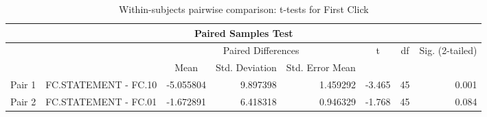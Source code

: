 \documentclass[a4paper]{article}
\begin{document}

\begin{table}[H]
\begin{center}
\caption{Within-subjects pairwise comparison: t-tests for First Click}
\label{tab:abct}
\begin{tabular}{|l|l|l|r|r|r|r|r|} 
\hline
\multicolumn{8}{|c|}{Paired Samples Test}                                                                                                                                                                                                                                                                                                               \\ 
\hline
       &                                      & \multicolumn{3}{c|}{Paired Differences}                                                                                                                   & \multicolumn{1}{c|}{\multirow{3}{*}{t}} & \multicolumn{1}{c|}{\multirow{3}{*}{df}} & \multicolumn{1}{c|}{\multirow{3}{*}{Sig. (2-tailed)}}  \\ 
\cline{1-5}
       &                                      & \multicolumn{1}{c|}{\multirow{2}{*}{Mean}} & \multicolumn{1}{c|}{\multirow{2}{*}{Std. Deviation}} & \multicolumn{1}{c|}{\multirow{2}{*}{Std. Error Mean}} & \multicolumn{1}{c|}{}                   & \multicolumn{1}{c|}{}                    & \multicolumn{1}{c|}{}                                  \\ 
\cline{1-2}
       &                                      & \multicolumn{1}{c|}{}                      & \multicolumn{1}{c|}{}                                & \multicolumn{1}{c|}{}                                 & \multicolumn{1}{c|}{}                   & \multicolumn{1}{c|}{}                    & \multicolumn{1}{c|}{}                                  \\ 
\hline
Pair 1 & FC.STATEMENT - FC.10 & -5.055804                                  & 9.897398                                             & 1.459292                                              & -3.465                                  & 45                                       & 0.001                                                  \\ 
\hline
Pair 2 & FC.STATEMENT - FC.01 & -1.672891                                  & 6.418318                                             & 0.946329                                              & -1.768                                  & 45                                       & 0.084                                                  \\ 

\end{tabular}
\end{center}
\end{table}
\end{document}
